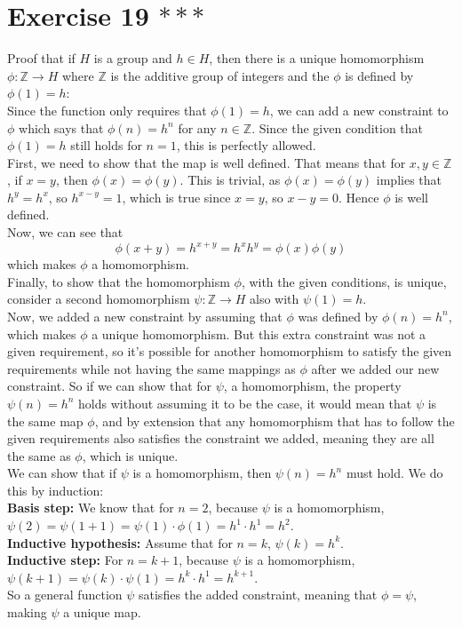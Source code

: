 \documentclass{article}
\newcommand{\Z}{\mathbb{Z}}
\begin{document}
    \section*{Exercise 19 $***$}
    Proof that if $H$ is a group and $h \in H$,
    then there is a unique homomorphism $\phi: \Z \to H$
    where $\Z$ is the additive group of integers
    and the $\phi$ is defined by $\phi(1) = h$: \\
    Since the function only requires that $\phi(1) = h$,
    we can add a new constraint to $\phi$ which says that 
    $\phi(n) = h^n$ for any $n \in \Z$.
    Since the given condition that $\phi(1) = h$ still holds for $n = 1$,
    this is perfectly allowed. \\
    First, we need to show that the map is well defined.
    That means that for $x, y \in \Z$, if $x = y$,
    then $\phi(x) = \phi(y)$.
    This is trivial,
    as $\phi(x) = \phi(y)$ implies that $h^y = h^x$,
    so $h^{x - y} = 1$,
    which is true since $x = y$,
    so $x - y = 0$.
    Hence $\phi$ is well defined. \\
    Now, we can see that
    \[ \phi(x + y) = h^{x + y}
    = h^xh^y
    = \phi(x)\phi(y) \]
    which makes $\phi$ a homomorphism. \\
    Finally, to show that the homomorphism $\phi$, with the given conditions,
    is unique,
    consider a second homomorphism $\psi: \Z \to H$
    also with $\psi(1) = h$. \\
    Now, we added a new constraint by assuming that $\phi$ was
    defined by $\phi(n) = h^n$,
    which makes $\phi$ a unique homomorphism.
    But this extra constraint was not a given requirement,
    so it's possible for another homomorphism to satisfy
    the given requirements while not having the same mappings as $\phi$
    after we added our new constraint.
    So if we can show that for $\psi$, a homomorphism,
    the property $\psi(n) = h^n$ holds without assuming it to be the case,
    it would mean that $\psi$ is the same map $\phi$,
    and by extension that any homomorphism that has to follow the given
    requirements also satisfies the constraint we added,
    meaning they are all the same as $\phi$, which is unique. \\
    We can show that if $\psi$ is a homomorphism,
    then $\psi(n) = h^n$ must hold.
    We do this by induction: \\
    \textbf{Basis step:}
    We know that for $n = 2$,
    because $\psi$ is a homomorphism,
    $\psi(2) = \psi(1 + 1)
    = \psi(1) \cdot \phi(1) = h^1 \cdot h^1 = h^2$. \\
    \textbf{Inductive hypothesis:}
    Assume that for $n = k$, $\psi(k) = h^k$. \\ 
    \textbf{Inductive step:}
    For $n = k + 1$, because $\psi$ is a homomorphism,
    $\psi(k + 1) = \psi(k) \cdot \psi(1)
    = h^k \cdot h^1 = h^{k+1}$. \\
    So a general function $\psi$ satisfies the added constraint,
    meaning that $\phi = \psi$,
    making $\psi$ a unique map.
\end{document}
